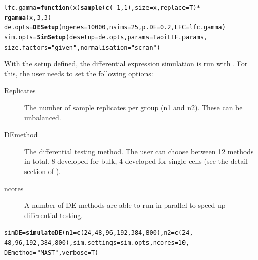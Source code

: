 \documentclass{article}\usepackage[]{graphicx}\usepackage[usenames,dvipsnames]{color}
\makeatletter
\newcommand{\hlnum}[1]{\textcolor[rgb]{0.686,0.059,0.569}{#1}}%
\newcommand{\hlstr}[1]{\textcolor[rgb]{0.192,0.494,0.8}{#1}}%
\newcommand{\hlopt}[1]{\textcolor[rgb]{0,0,0}{#1}}%
\newcommand{\hlstd}[1]{\textcolor[rgb]{0.345,0.345,0.345}{#1}}%
\newcommand{\hlkwa}[1]{\textcolor[rgb]{0.161,0.373,0.58}{\textbf{#1}}}%
\newcommand{\hlkwb}[1]{\textcolor[rgb]{0.69,0.353,0.396}{#1}}%
\newcommand{\hlkwc}[1]{\textcolor[rgb]{0.333,0.667,0.333}{#1}}%
\newcommand{\hlkwd}[1]{\textcolor[rgb]{0.737,0.353,0.396}{\textbf{#1}}}%
\newenvironment{kframe}{%
 \def\at@end@of@kframe{}%
 \ifinner\ifhmode%
  \def\at@end@of@kframe{\end{minipage}}%
  \begin{minipage}{\columnwidth}%
 \fi\fi%
 \def\FrameCommand##1{\hskip\@totalleftmargin \hskip-\fboxsep
 \colorbox{shadecolor}{##1}\hskip-\fboxsep
     \hskip-\linewidth \hskip-\@totalleftmargin \hskip\columnwidth}%
 \MakeFramed {\advance\hsize-\width
   \@totalleftmargin\z@ \linewidth\hsize
   \@setminipage}}%
 {\par\unskip\endMakeFramed%
 \at@end@of@kframe}
\newenvironment{knitrout}{}{} %
\makeatother
\begin{document}
\begin{knitrout}
\color{fgcolor}\begin{kframe}
\begin{alltt}
\hlstd{lfc.gamma} \hlkwb{=} \hlkwa{function}\hlstd{(}\hlkwc{x}\hlstd{)} \hlkwd{sample}\hlstd{(}\hlkwd{c}\hlstd{(}\hlopt{-}\hlnum{1}\hlstd{,} \hlnum{1}\hlstd{),} \hlkwc{size} \hlstd{= x,} \hlkwc{replace} \hlstd{= T)} \hlopt{*}
    \hlkwd{rgamma}\hlstd{(x,} \hlnum{3}\hlstd{,} \hlnum{3}\hlstd{)}
\hlstd{de.opts} \hlkwb{=} \hlkwd{DESetup}\hlstd{(}\hlkwc{ngenes} \hlstd{=} \hlnum{10000}\hlstd{,} \hlkwc{nsims} \hlstd{=} \hlnum{25}\hlstd{,} \hlkwc{p.DE} \hlstd{=} \hlnum{0.2}\hlstd{,} \hlkwc{LFC} \hlstd{= lfc.gamma)}
\hlstd{sim.opts} \hlkwb{=} \hlkwd{SimSetup}\hlstd{(}\hlkwc{desetup} \hlstd{= de.opts,} \hlkwc{params} \hlstd{= TwoiLIF.params,}
    \hlkwc{size.factors} \hlstd{=} \hlstr{"given"}\hlstd{,} \hlkwc{normalisation} \hlstd{=} \hlstr{"scran"}\hlstd{)}
\end{alltt}
\end{kframe}
\end{knitrout}

With the setup defined, the differential expression simulation is run with . For this, the user needs to set the following options:

\begin{description}
  \item[Replicates] The number of sample replicates per group (n1 and n2). These can be unbalanced.
  \item[DEmethod] The differential testing method. The user can choose between 12 methods in total.  8 developed for bulk, 4 developed for single cells (see the detail section of ).
  \item[ncores] A number of DE methods are able to run in parallel to speed up differential testing.
\end{description}

\begin{knitrout}
\color{fgcolor}\begin{kframe}
\begin{alltt}
\hlstd{simDE} \hlkwb{=} \hlkwd{simulateDE}\hlstd{(}\hlkwc{n1} \hlstd{=} \hlkwd{c}\hlstd{(}\hlnum{24}\hlstd{,} \hlnum{48}\hlstd{,} \hlnum{96}\hlstd{,} \hlnum{192}\hlstd{,} \hlnum{384}\hlstd{,} \hlnum{800}\hlstd{),} \hlkwc{n2} \hlstd{=} \hlkwd{c}\hlstd{(}\hlnum{24}\hlstd{,}
    \hlnum{48}\hlstd{,} \hlnum{96}\hlstd{,} \hlnum{192}\hlstd{,} \hlnum{384}\hlstd{,} \hlnum{800}\hlstd{),} \hlkwc{sim.settings} \hlstd{= sim.opts,} \hlkwc{ncores} \hlstd{=} \hlnum{10}\hlstd{,}
    \hlkwc{DEmethod} \hlstd{=} \hlstr{"MAST"}\hlstd{,} \hlkwc{verbose} \hlstd{= T)}
\end{alltt}
\end{kframe}
\end{knitrout}
\end{document}
